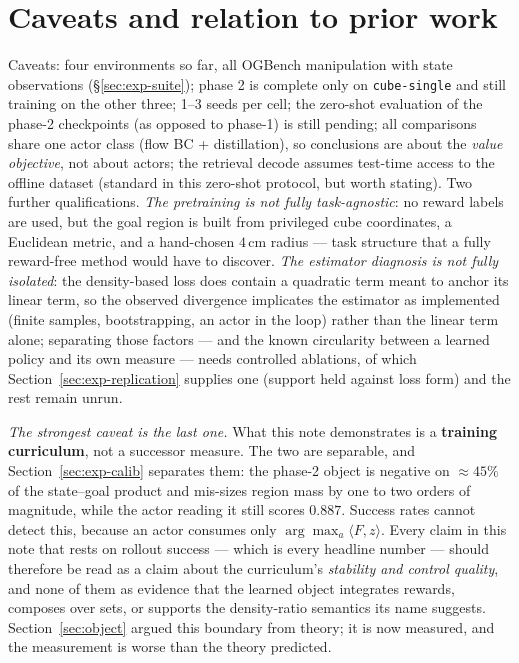 \documentclass[10pt]{article}
\begin{document}
\section{Caveats and relation to prior work}
\label{sec:caveats}

Caveats: four environments so far, all OGBench manipulation with state observations
(\S\ref{sec:exp-suite}); phase 2 is complete only on \texttt{cube-single} and still
training on the other three; 1--3 seeds per cell; the zero-shot evaluation of the phase-2 checkpoints (as opposed to phase-1) is still pending; all comparisons share one actor class (flow BC + distillation), so conclusions are about the \emph{value objective}, not about actors; the retrieval decode assumes test-time access to the offline dataset (standard in this zero-shot protocol, but worth stating).
Two further qualifications.
\emph{The pretraining is not fully task-agnostic}: no reward labels are used, but the goal
region is built from privileged cube coordinates, a Euclidean metric, and a hand-chosen
$4$\,cm radius --- task structure that a fully reward-free method would have to discover.
\emph{The estimator diagnosis is not fully isolated}: the density-based loss does contain a
quadratic term meant to anchor its linear term, so the observed divergence implicates the
estimator as implemented (finite samples, bootstrapping, an actor in the loop) rather than
the linear term alone; separating those factors --- and the known circularity between a
learned policy and its own measure --- needs controlled ablations, of which
Section~\ref{sec:exp-replication} supplies one (support held against loss form) and the
rest remain unrun.

\emph{The strongest caveat is the last one.} What this note demonstrates is a
\textbf{training curriculum}, not a successor measure. The two are separable, and
Section~\ref{sec:exp-calib} separates them: the phase-2 object is negative on
$\approx45\%$ of the state--goal product and mis-sizes region mass by one to two
orders of magnitude, while the actor reading it still scores $0.887$. Success
rates cannot detect this, because an actor consumes only
$\arg\max_a\langle F,z\rangle$. Every claim in this note that rests on rollout
success --- which is every headline number --- should therefore be read as a claim
about the curriculum's \emph{stability and control quality}, and none of them as
evidence that the learned object integrates rewards, composes over sets, or
supports the density-ratio semantics its name suggests. Section~\ref{sec:object}
argued this boundary from theory; it is now measured, and the measurement is worse
than the theory predicted.
\end{document}

